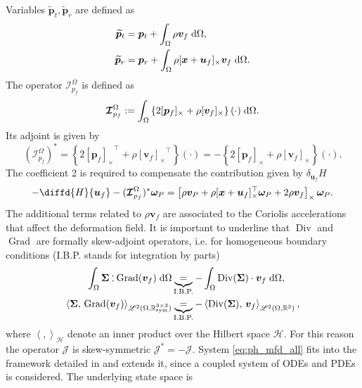 \documentclass{svjour3}                     %
\DeclareMathOperator*{\Grad}{Grad}
\DeclareMathOperator*{\Div}{Div}
\newcommand{\crmat}[1]{\ensuremath{[#1]_{\times}}}
\def\onedot{$\mathsurround0pt\ldotp$}
\def\cddot{%
	\mathbin{\vcenter{\baselineskip.67ex
			\hbox{\onedot}\hbox{\onedot}}%
}}
\begin{document}
Variables $\widetilde{\bm{p}}_t, \widetilde{\bm{p}}_r$ are defined as
\begin{equation}
\label{eq:mod_momenta}
\begin{aligned}
\widetilde{\bm{p}}_t &= \bm{p}_t + \int_{\Omega} \rho \bm{v}_f \d{\Omega}, \\
\widetilde{\bm{p}}_r &= \bm{p}_r + \int_{\Omega} \rho \crmat{\bm{x} + \bm{u}_f}\bm{v}_f \d{\Omega}. \\
\end{aligned}
\end{equation}
The operator $\bm{\mathcal{I}}_{p_f}^\Omega$ is defined as 
\begin{equation}
\label{eq:mod_momentafl}
\bm{\mathcal{I}}_{p_f}^\Omega := \int_\Omega \left\{2 \crmat{\bm{p}_f} + \rho \crmat{\bm{v}_f} \right\}(\cdot) \d{\Omega}.
\end{equation}
Its  adjoint is given by
\begin{equation*}
(\bm{\mathcal{I}}_{p_f}^\Omega)^* = \left\{2 \crmat{\bm{p}_f}^\top + \rho \crmat{\bm{v}_f}^\top \right\}(\cdot) = - \left\{2 \crmat{\bm{p}_f} + \rho \crmat{\bm{v}_f} \right\}(\cdot).
\end{equation*} 
The coefficient 2 is required to compensate the contribution given by $\delta_{\bm{u}_f} H$ 
\[
-\diffd{H}{\bm{u}_f} - (\bm{\mathcal{I}}_{p_f}^\Omega)^* \bm{\omega}_P = \left[\rho \bm{v}_P + \rho \crmat{\bm{x}+\bm{u}_f}^\top \bm\omega_P + 2 \rho \bm{v}_f \right]_\times \bm\omega_P.
\]
The additional terms related to $\rho \bm{v}_f$ are associated to the Coriolis accelerations that affect the deformation field. It is important to underline that $\Div$ and $\Grad$ are formally skew-adjoint operators, i.e. for homogeneous boundary conditions (I.B.P. stands for integration by parts)
\begin{align*}
\int_{\Omega} \bm\Sigma \cddot \Grad(\bm{v}_f) \d{\Omega} &\underbrace{=}_{\text{I.B.P.}} -\int_{\Omega} \Div(\bm\Sigma) \cdot \bm{v}_f \d{\Omega}, \\
\left\langle \bm\Sigma, \, \Grad(\bm{v}_f) \right\rangle_{\mathscr{L}^2(\Omega, \mathbb{R}^{3\times 3}_{\text{sym}})} &\underbrace{=}_{\text{I.B.P.}} -\left\langle\Div(\bm\Sigma), \, \bm{v}_f \right\rangle_{\mathscr{L}^2(\Omega, \mathbb{R}^3)}, 
\end{align*}
where $\left\langle ,  \right\rangle_\mathscr{H}$ denote an inner product over the Hilbert space $\mathscr{H}$. For this reason the operator $\bm{\mathcal{J}}$ is skew-symmetric $\bm{\mathcal{J}}_{}^*=-\bm{\mathcal{J}}$. System \eqref{eq:ph_mfd_all} fits into the framework detailed in \cite{mehrmann2019structurepreserving} and extends it, since a coupled system of ODEs and PDEs is considered. The underlying state space is 
\end{document}
